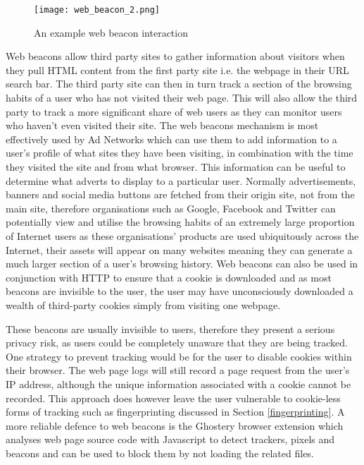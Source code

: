 \documentclass[12pt]{article}
\begin{document}
\begin{figure}[H]
    \centering
    \texttt{[image: web\_beacon\_2.png]}
    \caption{An example web beacon interaction}
    \label{fig:web_beacons}
\end{figure}

Web beacons allow third party sites to gather information about visitors when they pull HTML content from the first party site i.e. the webpage in their URL search bar. The third party site can then in turn track a section of the browsing habits of a user who has not visited their web page. This will also allow the third party to track a more significant share of web users as they can monitor users who haven't even visited their site. The web beacons mechanism is most effectively used by Ad Networks which can use them to add information to a user's profile of what sites they have been visiting, in combination with the time they visited the site and from what browser. This information can be useful to determine what adverts to display to a particular user. Normally advertisements, banners and social media buttons are fetched from their origin site, not from the main site, therefore organisations such as Google, Facebook and Twitter can potentially view and utilise the browsing habits of an extremely large proportion of Internet users as these organisations' products are used ubiquitously across the Internet, their assets will appear on many websites meaning they can generate a much larger section of a user's browsing history. Web beacons can also be used in conjunction with HTTP to ensure that a cookie is downloaded and as most beacons are invisible to the user, the user may have unconsciously downloaded a wealth of third-party cookies simply from visiting one webpage. \newline

These beacons are usually invisible to users, therefore they present a serious privacy risk, as users could be completely unaware that they are being tracked. One strategy to prevent tracking would be for the user to disable cookies within their browser. The web page logs will still record a page request from the user's IP address, although the unique information associated with a cookie cannot be recorded. This approach does however leave the user vulnerable to cookie-less forms of tracking such as fingerprinting discussed in Section \ref{fingerprinting}. A more reliable defence to web beacons is the Ghostery browser extension which analyses web page source code with Javascript to detect trackers, pixels and beacons and can be used to block them by not loading the related files. 
\end{document}
